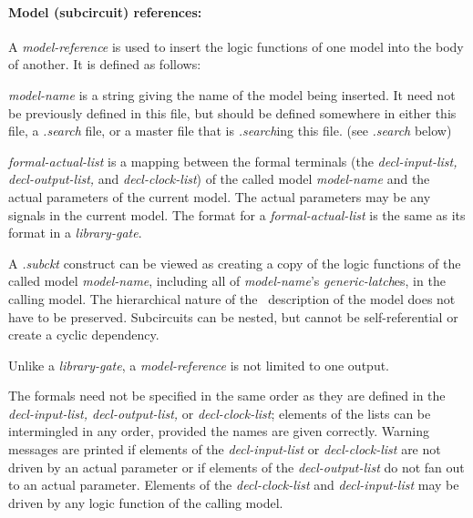 {\begin{pespace}
\paragraph{Model (subcircuit) references:}

A {\em model-reference} is used to insert the logic functions of one model
into the body of another.  It is defined as follows:

\begin{description}
\item {\em model-name} is a string giving the name of the model being
inserted.  It need not be previously defined in this file, but should be
defined somewhere in either this file, a {\em .search} file, or a master
file that is {\em .search}ing this file.  (see {\em .search} below)

\item {\em formal-actual-list} is a mapping between the formal terminals
(the {\em decl-input-list, decl-output-list,} and {\em decl-clock-list}) of
the called model {\em model-name} and the actual parameters of the current
model.  The actual parameters may be any signals in the current model.  The
format for a {\em formal-actual-list} is the same as its format in a {\em
library-gate}.
\end{description}

A {\em .subckt} construct can be viewed as creating a copy of the logic
functions of the called model {\em model-name}, including all of {\em
model-name}'s {\em generic-latch}es, in the calling model.  The hierarchical
nature of the \BLIF\ description of the model does not have to be
preserved.  Subcircuits can be nested, but cannot be self-referential or
create a cyclic dependency.

Unlike a {\em library-gate}, a {\em model-reference} is not limited to one
output.  

The formals need not be specified in the same order as they are defined in
the {\em decl-input-list, decl-output-list,} or {\em decl-clock-list};
elements of the lists can be intermingled in any order, provided the names
are given correctly.  Warning messages are printed if elements of the {\em
decl-input-list} or {\em decl-clock-list} are not driven by an actual
parameter or if elements of the {\em decl-output-list} do not fan out to an
actual parameter.  Elements of the {\em decl-clock-list} and {\em
decl-input-list} may be driven by any logic function of the calling model.


\end{pespace}}
